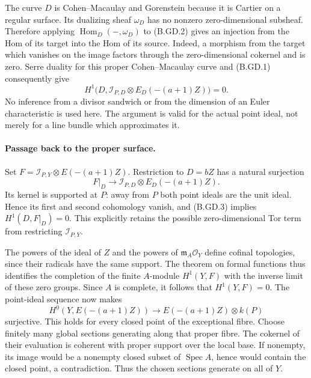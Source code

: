 The curve $D$ is Cohen--Macaulay and Gorenstein because it is Cartier
on a regular surface.  Its dualizing sheaf $\omega_D$ has no nonzero
zero-dimensional subsheaf.  Therefore applying
$\operatorname{Hom}_D(-,\omega_D)$ to (B.GD.2) gives an injection from
the Hom of its target into the Hom of its source.  Indeed, a morphism
from the target which vanishes on the image factors through the
zero-dimensional cokernel and is zero.  Serre duality for this proper
Cohen--Macaulay curve and (B.GD.1) consequently give
\[
 H^1\bigl(D,\mathcal I_{P,D}\otimes
                         E_D(-(a+1)Z)\bigr)=0.         \tag{B.GD.3}
\]
No inference from a divisor sandwich or from the dimension of an Euler
characteristic is used here.  The argument is valid for the actual
point ideal, not merely for a line bundle which approximates it.

\paragraph{Passage back to the proper surface.}
Set $F=\mathcal I_{P,Y}\otimes E(-(a+1)Z)$.  Restriction to $D=bZ$
has a natural surjection
\[
 F|_D\longrightarrow
        \mathcal I_{P,D}\otimes E_D(-(a+1)Z).
\]
Its kernel is supported at $P$: away from $P$ both point ideals are the
unit ideal.  Hence its first and second cohomology vanish, and (B.GD.3)
implies $H^1(D,F|_D)=0$.  This explicitly retains the possible
zero-dimensional Tor term from restricting $\mathcal I_{P,Y}$.

The powers of the ideal of $Z$ and the powers of
$\mathfrak m_A\mathcal O_Y$ define cofinal topologies, since their
radicals have the same support.  The theorem on formal functions thus
identifies the completion of the finite $A$-module $H^1(Y,F)$ with the
inverse limit of these zero groups.  Since $A$ is complete, it follows
that $H^1(Y,F)=0$.  The point-ideal sequence now makes
\[
 H^0(Y,E(-(a+1)Z))\longrightarrow E(-(a+1)Z)\otimes k(P)
\]
surjective.  This holds for every closed point of the exceptional
fibre.  Choose finitely many global sections generating along that
proper fibre.  The cokernel of their evaluation is coherent with
proper support over the local base.  If nonempty, its image would be
a nonempty closed subset of $\operatorname{Spec}A$, hence would contain
the closed point, a contradiction.  Thus the chosen sections generate
on all of $Y$.

